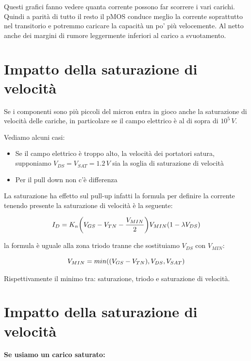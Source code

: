 Questi grafici fanno vedere quanta corrente possono far scorrere i vari carichi. Quindi a parità di tutto il resto il pMOS conduce meglio la corrente soprattutto nel transitorio e potremmo caricare la capacità un po' più velocemente. Al netto anche dei margini di rumore leggermente inferiori al carico a svuotamento.


\newpage
\section{Impatto della saturazione di velocità}

Se i componenti sono più piccoli del micron entra in gioco anche la saturazione di velocità delle cariche, in particolare se il campo elettrico è al di sopra di $10^5\,V$.

Vediamo alcuni casi:

\begin{itemize}
    \item Se	il	campo	elettrico	è	troppo	alto,	la	velocità	dei	portatori	satura, supponiamo	$V_{DS} = V_{SAT} = 1.2 \,V$	sia	la	soglia	di	saturazione di velocità

    \item Per	il	pull	down	non	c’è	differenza
\end{itemize}

La saturazione ha effetto sul pull-up infatti la formula per definire la corrente tenendo presente la saturazione di velocità è la seguente:

\begin{equation*}
    I_D = K_n\biggl( V_{GS} - V_{TN} - \frac{V_{MIN}}{2}\biggl)V_{MIN}(1-\lambda V_{DS})
\end{equation*}

la formula è uguale alla zona triodo tranne che sostituiamo $V_{DS}$ con $V_{MIN}$:

\begin{equation*}
    V_{MIN} = min((V_{GS} - V_{TN}), V_{DS}, V_{SAT})
\end{equation*}

Rispettivamente il minimo tra: saturazione, triodo e saturazione di velocità.


\section{Impatto della saturazione di velocità}

\paragraph{Se usiamo un carico saturato:}


